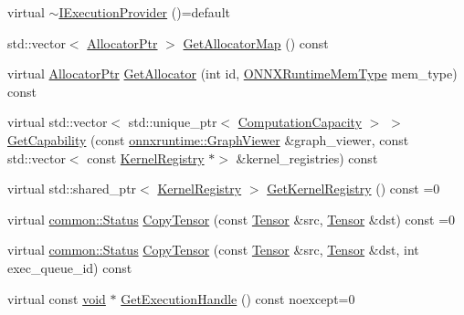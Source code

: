 \begin{DoxyCompactItemize}
\item 
virtual \mbox{\hyperlink{classonnxruntime_1_1IExecutionProvider_a996806d27429056e13184d5ff4590d24}{$\sim$\+I\+Execution\+Provider}} ()=default
\item 
std\+::vector$<$ \mbox{\hyperlink{namespaceonnxruntime_a6cdac724c5dcefded3a63f08dae58fda}{Allocator\+Ptr}} $>$ \mbox{\hyperlink{classonnxruntime_1_1IExecutionProvider_a25d94e7e7bd716f636a7f64802376751}{Get\+Allocator\+Map}} () const
\item 
virtual \mbox{\hyperlink{namespaceonnxruntime_a6cdac724c5dcefded3a63f08dae58fda}{Allocator\+Ptr}} \mbox{\hyperlink{classonnxruntime_1_1IExecutionProvider_ab4911f5441a3bd940b0384bc5a334b92}{Get\+Allocator}} (int id, \mbox{\hyperlink{allocator__info_8h_add3f8ee3ff93395704abae71c30cab18}{O\+N\+N\+X\+Runtime\+Mem\+Type}} mem\+\_\+type) const
\item 
virtual std\+::vector$<$ std\+::unique\+\_\+ptr$<$ \mbox{\hyperlink{structonnxruntime_1_1ComputationCapacity}{Computation\+Capacity}} $>$ $>$ \mbox{\hyperlink{classonnxruntime_1_1IExecutionProvider_a6f17ba64b2355b26293a4cfc3fac376f}{Get\+Capability}} (const \mbox{\hyperlink{classonnxruntime_1_1GraphViewer}{onnxruntime\+::\+Graph\+Viewer}} \&graph\+\_\+viewer, const std\+::vector$<$ const \mbox{\hyperlink{classonnxruntime_1_1KernelRegistry}{Kernel\+Registry}} $\ast$$>$ \&kernel\+\_\+registries) const
\item 
virtual std\+::shared\+\_\+ptr$<$ \mbox{\hyperlink{classonnxruntime_1_1KernelRegistry}{Kernel\+Registry}} $>$ \mbox{\hyperlink{classonnxruntime_1_1IExecutionProvider_a83caf9a8da9fcbc4e7fdc891055d664d}{Get\+Kernel\+Registry}} () const =0
\item 
virtual \mbox{\hyperlink{classonnxruntime_1_1common_1_1Status}{common\+::\+Status}} \mbox{\hyperlink{classonnxruntime_1_1IExecutionProvider_a2b9bb47c0d2d72598ceb381688adfe26}{Copy\+Tensor}} (const \mbox{\hyperlink{classonnxruntime_1_1Tensor}{Tensor}} \&src, \mbox{\hyperlink{classonnxruntime_1_1Tensor}{Tensor}} \&dst) const =0
\item 
virtual \mbox{\hyperlink{classonnxruntime_1_1common_1_1Status}{common\+::\+Status}} \mbox{\hyperlink{classonnxruntime_1_1IExecutionProvider_ac72d136c6a46bb4f33c9a877e01cccaa}{Copy\+Tensor}} (const \mbox{\hyperlink{classonnxruntime_1_1Tensor}{Tensor}} \&src, \mbox{\hyperlink{classonnxruntime_1_1Tensor}{Tensor}} \&dst, int exec\+\_\+queue\+\_\+id) const
\item 
virtual const \mbox{\hyperlink{mlasi_8h_a88f941d423cb2a819b70a1358982b1a6}{void}} $\ast$ \mbox{\hyperlink{classonnxruntime_1_1IExecutionProvider_aebaeab04945539bc5db5942b63684ccb}{Get\+Execution\+Handle}} () const noexcept=0
$$
\end{DoxyCompactItemize}
